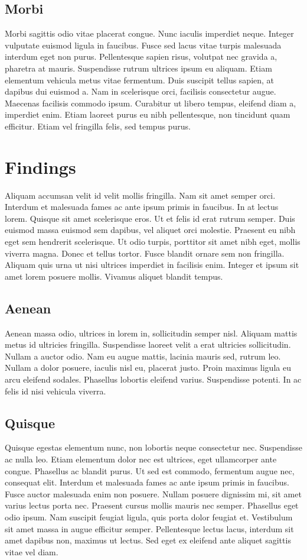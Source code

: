 \documentclass{scrartcl}
\begin{document}
\subsection{Morbi}
Morbi sagittis odio vitae placerat congue. Nunc iaculis imperdiet neque. Integer vulputate euismod ligula in faucibus. Fusce sed lacus vitae turpis malesuada interdum eget non purus. Pellentesque sapien risus, volutpat nec gravida a, pharetra at mauris. Suspendisse rutrum ultrices ipsum eu aliquam. Etiam elementum vehicula metus vitae fermentum. Duis suscipit tellus sapien, at dapibus dui euismod a. Nam in scelerisque orci, facilisis consectetur augue. Maecenas facilisis commodo ipsum. Curabitur ut libero tempus, eleifend diam a, imperdiet enim. Etiam laoreet purus eu nibh pellentesque, non tincidunt quam efficitur. Etiam vel fringilla felis, sed tempus purus. 


\section{Findings}\label{sec:findings}
Aliquam accumsan velit id velit mollis fringilla. Nam sit amet semper orci. Interdum et malesuada fames ac ante ipsum primis in faucibus. In at lectus lorem. Quisque sit amet scelerisque eros. Ut et felis id erat rutrum semper. Duis euismod massa euismod sem dapibus, vel aliquet orci molestie. Praesent eu nibh eget sem hendrerit scelerisque. Ut odio turpis, porttitor sit amet nibh eget, mollis viverra magna. Donec et tellus tortor. Fusce blandit ornare sem non fringilla. Aliquam quis urna ut nisi ultrices imperdiet in facilisis enim. Integer et ipsum sit amet lorem posuere mollis. Vivamus aliquet blandit tempus. 


\subsection{Aenean}
Aenean massa odio, ultrices in lorem in, sollicitudin semper nisl. Aliquam mattis metus id ultricies fringilla. Suspendisse laoreet velit a erat ultricies sollicitudin. Nullam a auctor odio. Nam eu augue mattis, lacinia mauris sed, rutrum leo. Nullam a dolor posuere, iaculis nisl eu, placerat justo. Proin maximus ligula eu arcu eleifend sodales. Phasellus lobortis eleifend varius. Suspendisse potenti. In ac felis id nisi vehicula viverra. 

\subsection{Quisque}
Quisque egestas elementum nunc, non lobortis neque consectetur nec. Suspendisse ac nulla leo. Etiam elementum dolor nec est ultrices, eget ullamcorper ante congue. Phasellus ac blandit purus. Ut sed est commodo, fermentum augue nec, consequat elit. Interdum et malesuada fames ac ante ipsum primis in faucibus. Fusce auctor malesuada enim non posuere. Nullam posuere dignissim mi, sit amet varius lectus porta nec. Praesent cursus mollis mauris nec semper. Phasellus eget odio ipsum. Nam suscipit feugiat ligula, quis porta dolor feugiat et. Vestibulum sit amet massa in augue efficitur semper. Pellentesque lectus lacus, interdum sit amet dapibus non, maximus ut lectus. Sed eget ex eleifend ante aliquet sagittis vitae vel diam. 
\end{document}
